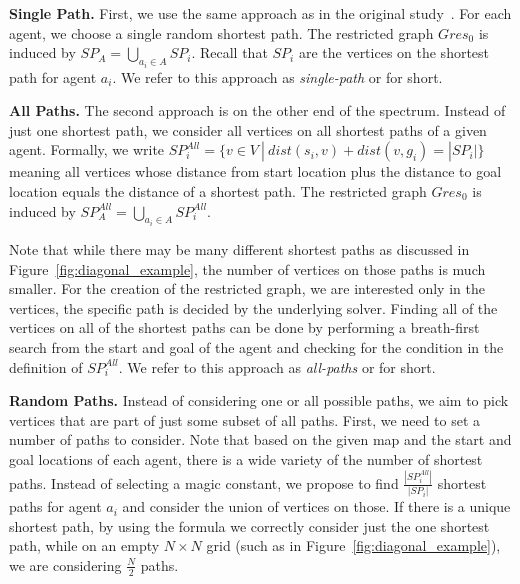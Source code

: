 \textbf{Single Path.}
First, we use the same approach as in the original study~\cite{AAMAS_corridors}.
For each agent, we choose a single random shortest path. The restricted graph $\mathit{Gres}_{0}$ is induced by $SP_A = \bigcup_{a_i \in A} SP_i$. Recall that $SP_i$ are the vertices on the shortest path for agent $a_i$. We refer to this approach as \emph{single-path} or \pss{} for short.

\textbf{All Paths.}
The second approach is on the other end of the spectrum. Instead of just one shortest path, we consider all vertices on all shortest paths of a given agent. Formally, we write $SP_i^{\mathit{All}} = \{ v \in V \: | \: \mathit{dist}(s_i,v) + \mathit{dist}(v,g_i) = |SP_i|\}$ meaning all vertices whose distance from start location plus the distance to goal location equals the distance of a shortest path. The restricted graph $\mathit{Gres}_{0}$ is induced by $SP_A^{\mathit{All}} = \bigcup_{a_i \in A} SP_i^{\mathit{All}}$.

Note that while there may be many different shortest paths as discussed in Figure~\ref{fig:diagonal_example}, the number of vertices on those paths is much smaller. For the creation of the restricted graph, we are interested only in the vertices, the specific path is decided by the underlying solver. Finding all of the vertices on all of the shortest paths can be done by performing a breath-first search from the start and goal of the agent and checking for the condition in the definition of $SP_i^{\mathit{All}}$. We refer to this approach as \emph{all-paths} or \psa{} for short.




%
\textbf{Random Paths.}
Instead of considering one or all possible paths, we aim to pick vertices that are part of just some subset of all paths. First, we need to set a number of paths to consider. Note that based on the given map and the start and goal locations of each agent, there is a wide variety of the number of shortest paths. Instead of selecting a magic constant, we propose to find $\frac{|SP_i^{\mathit{All}}|}{|SP_i|}$ shortest paths for agent $a_i$ and consider the union of vertices on those. If there is a unique shortest path, by using the formula we correctly consider just the one shortest path, while on an empty $N \times N$ grid (such as in Figure~\ref{fig:diagonal_example}), we are considering $\frac{N}{2}$ paths.


